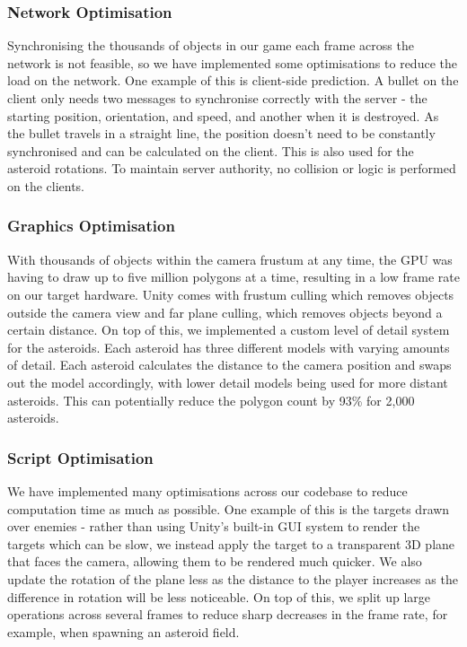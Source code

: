 \documentclass[a4paper,11pt]{article}
\begin{document}
\subsubsection{Network Optimisation}
Synchronising the thousands of objects in our game each frame across the network is not feasible, so we have implemented some optimisations to reduce the load on the network. One example of this is client-side prediction. A bullet on the client only needs two messages to synchronise correctly with the server - the starting position, orientation, and speed, and another when it is destroyed. As the bullet travels in a straight line, the position doesn’t need to be constantly synchronised and can be calculated on the client. This is also used for the asteroid rotations. To maintain server authority, no collision or logic is performed on the clients.

\subsubsection{Graphics Optimisation}
With thousands of objects within the camera frustum at any time, the GPU was having to draw up to five million polygons at a time, resulting in a low frame rate on our target hardware. Unity comes with frustum culling which removes objects outside the camera view and far plane culling, which removes objects beyond a certain distance. On top of this, we implemented a custom level of detail system for the asteroids. Each asteroid has three different models with varying amounts of detail. Each asteroid calculates the distance to the camera position and swaps out the model accordingly, with lower detail models being used for more distant asteroids. This can potentially reduce the polygon count by 93\% for 2,000 asteroids.

\subsubsection{Script Optimisation}
We have implemented many optimisations across our codebase to reduce computation time as much as possible. One example of this is the targets drawn over enemies - rather than using Unity’s built-in GUI system to render the targets which can be slow, we instead apply the target to a transparent 3D plane that faces the camera, allowing them to be rendered much quicker. We also update the rotation of the plane less as the distance to the player increases as the difference in rotation will be less noticeable. On top of this, we split up large operations across several frames to reduce sharp decreases in the frame rate, for example, when spawning an asteroid field.
\end{document}

